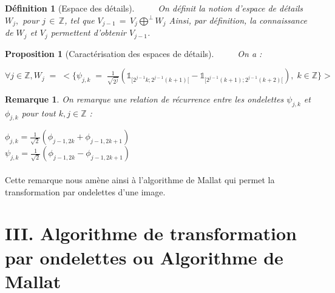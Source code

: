 \documentclass[a4paper,10pt]{report}
\theoremstyle{break}
\newtheorem{Def}{D\'{e}finition}
\newtheorem{Prop}{Proposition}
\newtheorem{Rem}{Remarque}
\begin{document}
    \begin{Def}[Espace des d\'{e}tails]
	$\phantom{Prop}$ On d\'{e}finit la notion d'espace de d\'{e}tails $ W_j , $ pour $ j \, \in \, \mathbb{Z} $, tel que \newline
	$ V_{j - 1} \, = \, V_j \displaystyle \bigoplus^\perp W_j $ \newline
	Ainsi, par d\'{e}finition, la connaissance de $ W_j $ et $ V_j $ permettent d'obtenir $ V_{j - 1} $.
    \end{Def}
    
    \begin{Prop}[Caract\'{e}risation des espaces de d\'{e}tails]
	  $\phantom{Prop}$ On a : 
	  
	  \begin{center}
	  $ \forall j \in \mathbb{Z}, W_j \; = \; 
	  \Bigg< \Big\{ \psi_{j,k} \; = \; \frac{1}{\sqrt{2^j}} (\mathbb{1}_{[2^{j - 1} k ; 2^{j - 1} (k + 1)[} - 
		\mathbb{1}_{[2^{j - 1} (k + 1) ; 2^{j - 1} (k + 2)[} ),  \; k \in \mathbb{Z} \Big\} \Bigg> $ 
	  \end{center}
    \end{Prop}

    \begin{Rem} On remarque une relation de r\'{e}currence entre les ondelettes $ \psi_{j,k} $ et $ \phi_{j,k} $ pour tout $ k, j \in \mathbb{Z} $ :
	\begin{center}
	  $ \phi_{j,k} = \frac{1}{\sqrt{2}} (\phi_{j - 1, 2 k} + \phi_{j - 1, 2 k + 1}) $ \\
	  $ \psi_{j,k} = \frac{1}{\sqrt{2}} (\phi_{j - 1, 2 k} - \phi_{j - 1, 2 k + 1}) $
	\end{center}
    \end{Rem}
    
    \paragraph{} Cette remarque nous am\`{e}ne ainsi \`{a} l'algorithme de Mallat qui permet la transformation par ondelettes d'une image.
      
\newpage
	
  \section{III. Algorithme de transformation par ondelettes ou Algorithme de Mallat}
\end{document}
